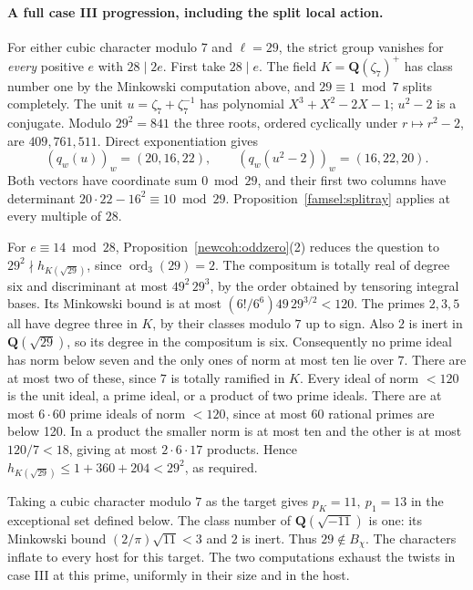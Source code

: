 \paragraph{A full case III progression, including the split local action.}
For either cubic character modulo \(7\) and \(\ell=29\), the strict
group vanishes for \emph{every} positive \(e\) with \(28\mid2e\).
First take \(28\mid e\). The field \(K=\mathbf Q(\zeta_7)^+\) has
class number one by the Minkowski computation above, and \(29\equiv1\bmod7\)
splits completely. The unit \(u=\zeta_7+\zeta_7^{-1}\) has polynomial
\(X^3+X^2-2X-1\); \(u^2-2\) is a conjugate. Modulo \(29^2=841\)
the three roots, ordered cyclically under \(r\mapsto r^2-2\), are
\(409,761,511\). Direct exponentiation gives
\[
 (q_w(u))_w=(20,16,22),\qquad (q_w(u^2-2))_w=(16,22,20).
\]
Both vectors have coordinate sum \(0\bmod29\), and their first
two columns have determinant \(20\cdot22-16^2\equiv10\bmod29\).
Proposition~\ref{famsel:splitray} applies at every multiple of \(28\).

For \(e\equiv14\bmod28\), Proposition~\ref{newcoh:oddzero}(2)
reduces the question to \(29^2\nmid h_{K(\sqrt{29})}\), since
\(\operatorname{ord}_3(29)=2\). The compositum is totally real of
degree six and discriminant at most \(49^2\,29^3\), by the order
obtained by tensoring integral bases. Its Minkowski bound is
at most \((6!/6^6)49\,29^{3/2}<120\).
The primes \(2,3,5\) all have degree three in \(K\), by their
classes modulo \(7\) up to sign. Also \(2\) is inert in
\(\mathbf Q(\sqrt{29})\), so its degree in the compositum is six.
Consequently no prime ideal has norm below seven and the only ones
of norm at most ten lie over \(7\). There are at most two of these,
since \(7\) is totally ramified in \(K\).
Every ideal of norm \(<120\) is the unit ideal, a prime ideal, or a
product of two prime ideals. There are at most \(6\cdot60\) prime
ideals of norm \(<120\), since at most 60 rational primes are below
120. In a product the smaller norm is at most ten and the other is
at most \(120/7<18\), giving at most \(2\cdot6\cdot17\) products.
Hence \(h_{K(\sqrt{29})}\le1+360+204<29^2\), as required.

Taking a cubic character modulo \(7\) as the target gives
\(p_K=11,\ p_1=13\) in the exceptional set defined below. The class
number of \(\mathbf Q(\sqrt{-11})\) is one: its Minkowski bound
\((2/\pi)\sqrt{11}<3\) and \(2\) is inert. Thus \(29\notin B_\chi\).
The characters inflate to every host for this target. The two
computations exhaust the twists in case III at this prime, uniformly
in their size and in the host.

